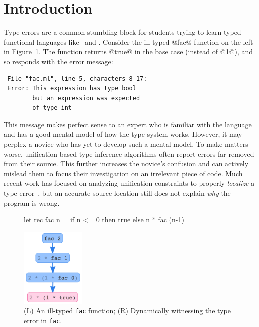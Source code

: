 \section{Introduction}
\label{sec:introduction}

Type errors are a common stumbling block for students
trying to learn typed functional languages like \ocaml\
and \haskell.
%
Consider the ill-typed @fac@ function on the left in
Figure~\ref{fig:factorial}.
%
The function returns @true@ in the base case (instead of @1@),
and so \ocaml responds with the error message:
%
\begin{verbatim}
 File "fac.ml", line 5, characters 8-17:
 Error: This expression has type bool
        but an expression was expected
        of type int
\end{verbatim}
%
This message makes perfect sense to an expert who is familiar
with the language and has a good mental model of how the type
system works.
%
However, it may perplex a novice who has yet to develop such a
mental model.
%
To make matters worse, unification-based type inference algorithms
often report errors far removed from their source.
%
This further increases the novice's confusion and can actively mislead
them to focus their investigation on an irrelevant piece of code.
%
Much recent work has focused on analyzing unification constraints
to properly \emph{localize} a type error~\cite{lerner_searching_2007,chen_counter-factual_2014,zhang_toward_2014,pavlinovic_finding_2014},
but an accurate source location still does not explain \emph{why} the
program is wrong.


\begin{figure}[t]
\centering
\begin{minipage}{.49\linewidth}
\centering
\begin{code}
  let rec fac n =
    if n <= 0 then
      true
    else
      n * fac (n-1)
\end{code}
\end{minipage}
\begin{minipage}{.49\linewidth}
\centering
  \includegraphics[height=1.5in]{fac-overview.png}
\end{minipage}
\caption{(L) An ill-typed \texttt{fac} function; (R) Dynamically witnessing the type error in \texttt{fac}.}
\label{fig:factorial}
\end{figure}

